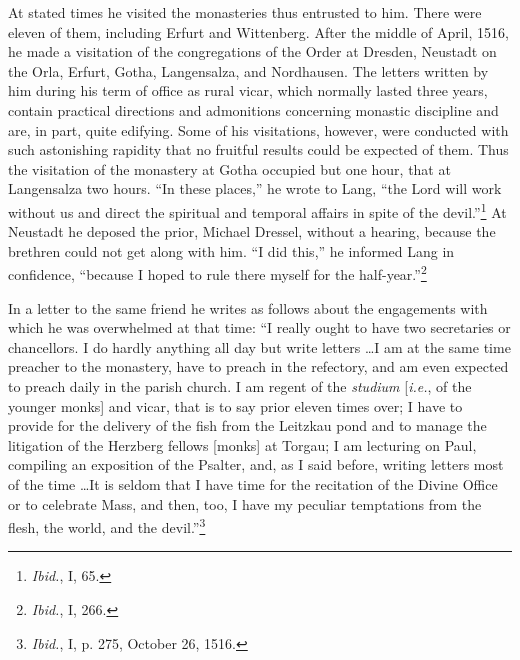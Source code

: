 At stated times he visited the monasteries thus entrusted to him.
There were eleven of them, including Erfurt and Wittenberg. After
the middle of April, 1516, he made a visitation of the congregations
of the Order at Dresden, Neustadt on the Orla, Erfurt, Gotha,
Langensalza, and Nordhausen. The letters written by him during
his term of office as rural vicar, which normally lasted three years,
contain practical directions and admonitions concerning monastic
discipline and are, in part, quite edifying. Some of his visitations,
however, were conducted with such astonishing rapidity that no
fruitful results could be expected of them. Thus the visitation of
the monastery at Gotha occupied but one hour, that at Langensalza
two hours. “In these places,” he wrote to Lang, “the Lord will work
without us and direct the spiritual and temporal affairs in spite of
the devil.”\footnote{\textit{Ibid.}, I, 65.}
At Neustadt he deposed the prior, Michael Dressel, without a hearing,
because the brethren could not get along with him.
“I did this,” he informed Lang in confidence, “because I hoped to
rule there myself for the half-year.”\footnote{\textit{Ibid.}, I, 266.}

In a letter to the same friend he writes as follows about the engagements
with which he was overwhelmed at that time: ``I really
ought to have two secretaries or chancellors. I do hardly anything
all day but write letters \dots I am at the same time preacher to
the monastery, have to preach in the refectory, and am even expected
to preach daily in the parish church. I am regent of the
\textit{studium} [\textit{i.e.}, of the younger monks] and vicar, that is to say prior
eleven times over; I have to provide for the delivery of the fish from
the Leitzkau pond and to manage the litigation of the Herzberg
fellows [monks] at Torgau; I am lecturing on Paul, compiling
an exposition of the Psalter, and, as I said before, writing letters
most of the time \dots It is seldom that I have time for the recitation
of the Divine Office or to celebrate Mass, and then, too,
I have my peculiar temptations from the flesh, the world, and the
devil.”\footnote{\textit{Ibid.}, I, p. 275, October 26, 1516.}
